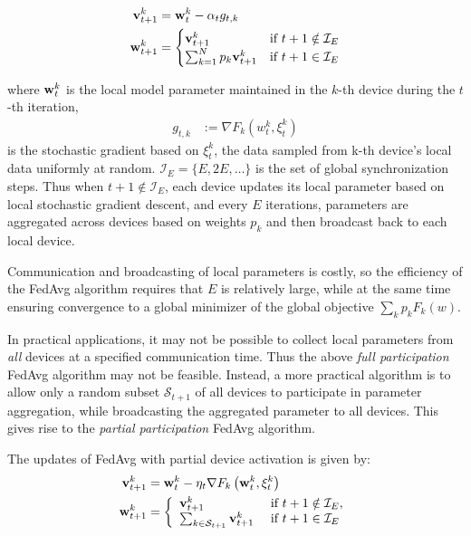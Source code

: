 \begin{align}
{\mathbf{v}}_{t+1}^{k} & ={\mathbf{w}}_{t}^{k}-\alpha_{t}g_{t,k}\\
{\mathbf{w}}_{t+1}^{k} & =\begin{cases}
{\mathbf{v}}_{t+1}^{k} & \text{if }t+1\notin\mathcal{I}_{E}\\
\sum_{k=1}^{N}p_{k}{\mathbf{v}}_{t+1}^{k} & \text{if }t+1\in\mathcal{I}_{E}
\end{cases}
\end{align}

where ${\mathbf{w}}_t^k$ is the local model parameter maintained in the $k$-th device during the $t$-th iteration, 
\begin{align}
g_{t,k} & :=\nabla F_{k}(w_{t}^{k},\xi_{t}^{k})
\end{align} 
is the stochastic gradient based on $\xi_{t}^{k}$, the data sampled from k-th device’s local data uniformly at random. $\mathcal{I}_{E}=\{E,2E,\dots\}$
is the set of global synchronization steps. Thus when $t+1 \notin \mathcal{I}_{E}$, each device updates its local parameter based on local
stochastic gradient descent, and every $E$ iterations, parameters are aggregated
across devices based on weights $p_{k}$ and then broadcast back to
each local device. 

Communication and broadcasting of local parameters
is costly, so the efficiency of the FedAvg algorithm requires that
$E$ is relatively large, while at the same time ensuring convergence
to a global minimizer of the global objective $\sum_{k}p_{k}F_{k}(w)$. 

In practical applications, it may not be possible to collect local
parameters from \emph{all }devices at a specified communication time.
Thus the above \emph{full participation }FedAvg algorithm may not
be feasible. Instead, a more practical algorithm is to allow only
a random subset $\mathcal{S}_{t+1}$ of all devices to participate in parameter aggregation, while
broadcasting the aggregated parameter to all devices. This gives rise
to the \emph{partial participation }FedAvg algorithm. 

The updates of FedAvg with partial device activation is given by: 
\begin{align} 
\mathbf{v}_{t+1}^{k} &=\mathbf{w}_{t}^{k}-\eta_{t} \nabla F_{k}\left(\mathbf{w}_{t}^{k}, \xi_{t}^{k}\right) \\ \mathbf{w}_{t+1}^{k} &=\left\{\begin{array}{ll}\mathbf{v}_{t+1}^{k} & \text { if } t+1 \notin \mathcal{I}_{E}, \\ 
\sum_{k \in {\mathcal{S}}_{t+1}} \mathbf{v}_{t+1}^{k} & \text { if } t+1 \in \mathcal{I}_{E}\end{array}\right.
\end{align}

